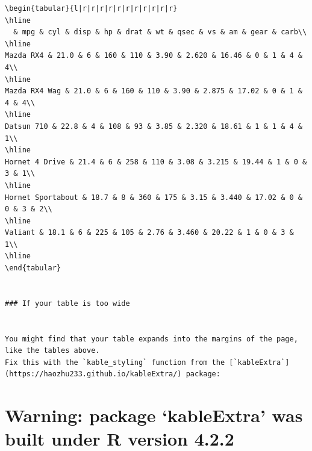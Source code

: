 \documentclass[a4paper, nobind]{templates/ociamthesis}
\begin{document}
\begin{verbatim}
\begin{tabular}{l|r|r|r|r|r|r|r|r|r|r|r}
\hline
  & mpg & cyl & disp & hp & drat & wt & qsec & vs & am & gear & carb\\
\hline
Mazda RX4 & 21.0 & 6 & 160 & 110 & 3.90 & 2.620 & 16.46 & 0 & 1 & 4 & 4\\
\hline
Mazda RX4 Wag & 21.0 & 6 & 160 & 110 & 3.90 & 2.875 & 17.02 & 0 & 1 & 4 & 4\\
\hline
Datsun 710 & 22.8 & 4 & 108 & 93 & 3.85 & 2.320 & 18.61 & 1 & 1 & 4 & 1\\
\hline
Hornet 4 Drive & 21.4 & 6 & 258 & 110 & 3.08 & 3.215 & 19.44 & 1 & 0 & 3 & 1\\
\hline
Hornet Sportabout & 18.7 & 8 & 360 & 175 & 3.15 & 3.440 & 17.02 & 0 & 0 & 3 & 2\\
\hline
Valiant & 18.1 & 6 & 225 & 105 & 2.76 & 3.460 & 20.22 & 1 & 0 & 3 & 1\\
\hline
\end{tabular}


### If your table is too wide


You might find that your table expands into the margins of the page, like the tables above.
Fix this with the `kable_styling` function from the [`kableExtra`](https://haozhu233.github.io/kableExtra/) package:

\end{verbatim}

\hypertarget{warning-package-kableextra-was-built-under-r-version-4.2.2}{%
\section{Warning: package `kableExtra' was built under R version 4.2.2}\label{warning-package-kableextra-was-built-under-r-version-4.2.2}}
\end{document}
